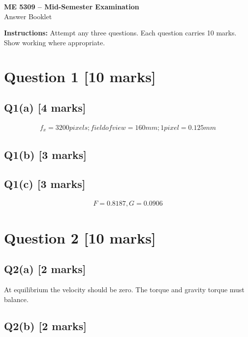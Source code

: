 \documentclass[11pt,a4paper]{article}
\begin{document}
\begin{center}
{\Large\bfseries ME 5309 -- Mid-Semester Examination}\\[3pt]
{\large Answer Booklet}\\[8pt]
\end{center}
\textbf{Instructions:} Attempt any three questions. Each question carries 10 marks. Show working where appropriate.
\section*{Question 1 \hfill [10 marks]}
\subsection*{Q1(a) \hfill [4 marks]}

\[\begin{aligned}f_x = 3200 pixels; field of view = 160 mm; 1 pixel = 0.125 mm\end{aligned}\]

\subsection*{Q1(b) \hfill [3 marks]}

\vspace{2mm}

\subsection*{Q1(c) \hfill [3 marks]}

\[\begin{aligned}F = 0.8187, G = 0.0906\end{aligned}\]

\section*{Question 2 \hfill [10 marks]}
\subsection*{Q2(a) \hfill [2 marks]}

At equilibrium the velocity should be zero.
The torque and gravity torque must balance.

\subsection*{Q2(b) \hfill [2 marks]}
\end{document}
